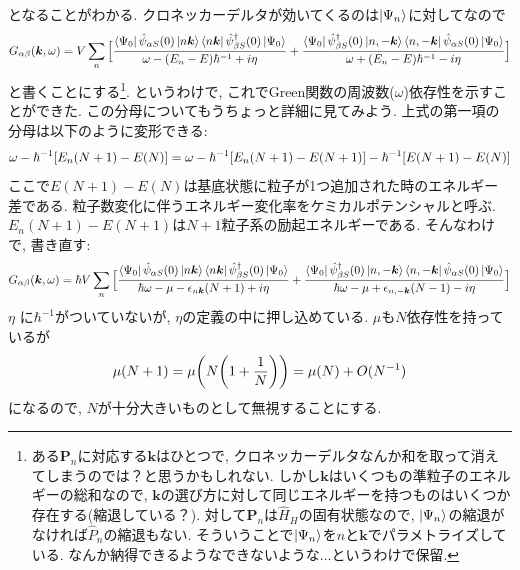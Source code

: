 \documentclass[10.5pt,a4paper]{jreport}
\newcommand{\bk}{\bm{k}}
\begin{document}
となることがわかる. クロネッカーデルタが効いてくるのは$\ket{\Psi_n}$に対してなので
\begin{eqnarray}
  G_{\alpha\beta}(\bk, \omega) = V\sum_n\Big[\frac{\bra{\Psi_0}\hat{\psi}_{\alpha S}(0)\ket{n\bk}\bra{n\bk}\hat{\psi}^\dagger_{\beta S}(0)\ket{\Psi_0}}{\omega - \qty(E_n - E)\hbar^{-1} + i\eta}+ \frac{\bra{\Psi_0}\hat{\psi}^\dagger_{\beta S}(0)\ket{n, -\bk}\bra{n, -\bk}\hat{\psi}_{\alpha S}(0)\ket{\Psi_0}}{\omega + \qty(E_n - E)\hbar^{-1} - i\eta}\Big]
\end{eqnarray}
と書くことにする\footnote{ある$\bm{P}_n$に対応する$\bk$はひとつで, クロネッカーデルタなんか和を取って消えてしまうのでは？と思うかもしれない. しかし$\bk$はいくつもの準粒子のエネルギーの総和なので, $\bk$の選び方に対して同じエネルギーを持つものはいくつか存在する(縮退している？). 対して$\bm{P}_n$は$\hat{H}_H$の固有状態なので, $\ket{\Psi_n}$の縮退がなければ$\hat{P}_n$の縮退もない. そういうことで$\ket{\Psi_n}$を$n$と$\bk$でパラメトライズしている. なんか納得できるようなできないような...というわけで保留. }. というわけで, これでGreen関数の周波数($\omega$)依存性を示すことができた. この分母についてもうちょっと詳細に見てみよう. 上式の第一項の分母は以下のように変形できる:
\begin{eqnarray}
  \omega - \hbar^{-1}\qty[E_n(N+1) - E(N)] = \omega - \hbar^{-1}\qty[E_n(N+1) - E(N+1)] -\hbar^{-1}\qty[E(N+1) - E(N)]
\end{eqnarray}
ここで$E(N+1) - E(N)$は基底状態に粒子が1つ追加された時のエネルギー差である. 粒子数変化に伴うエネルギー変化率をケミカルポテンシャルと呼ぶ. $E_n(N+1) - E(N+1)$は$N+1$粒子系の励起エネルギーである. そんなわけで, 書き直す:
\begin{eqnarray}
  G_{\alpha\beta}(\bk, \omega) = \hbar V\sum_n\Big[\frac{\bra{\Psi_0}\hat{\psi}_{\alpha S}(0)\ket{n\bk}\bra{n\bk}\hat{\psi}^\dagger_{\beta S}(0)\ket{\Psi_0}}{\hbar\omega -\mu - \epsilon_{n\bk}\qty(N+1) + i\eta}+ \frac{\bra{\Psi_0}\hat{\psi}^\dagger_{\beta S}(0)\ket{n, -\bk}\bra{n, -\bk}\hat{\psi}_{\alpha S}(0)\ket{\Psi_0}}{\hbar\omega -\mu + \epsilon_{n,-\bk}\qty(N-1) - i\eta}\Big]\label{green-rehmann}
\end{eqnarray}
$\eta$ に$\hbar^{-1}$がついていないが, $\eta$の定義の中に押し込めている. $\mu$も$N$依存性を持っているが
\begin{eqnarray}
  \mu(N+1) = \mu\qty(N\qty(1+\frac{1}{N})) = \mu(N) + O(N^{-1})
\end{eqnarray}
になるので, $N$が十分大きいものとして無視することにする.
\end{document}
